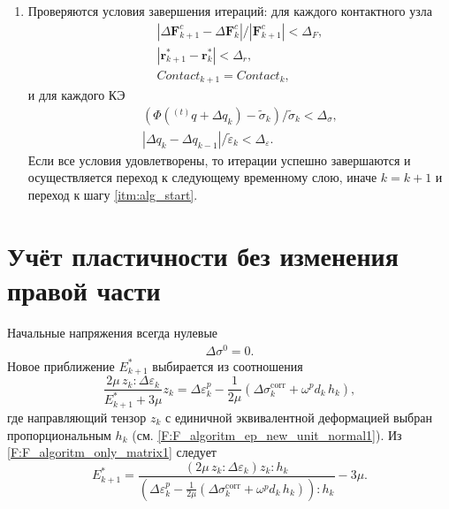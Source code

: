 \begin{enumerate}
	\item
	Проверяются условия завершения итераций: для каждого контактного узла
	\begin{equation}
	\begin{gathered}
	\left|\Delta\mathbf{F}_{k+1}^{c}-\Delta\mathbf{F}_k^{c}\right|/\left|\mathbf{F}_{k+1}^{c}\right|<\Delta_F,\\
	\left|\mathbf{r}_{k+1}^{*}-\mathbf{r}_k^{*}\right|<\Delta_r,\\
	Contact_{k+1}=Contact_{k},
	\label{F:F_algoritm10}
	\end{gathered}
	\end{equation}
	и для каждого КЭ
	\begin{equation}
	\begin{gathered}
	\left(\Phi\left({}^{(t)}q+\Delta q_k\right)-\tilde{\sigma}_k\right)/\tilde{\sigma}_{k}<\Delta_{\sigma},\\
	\left|\Delta q_{k}-\Delta q_{k-1}\right|/\tilde{\varepsilon}_{k}<\Delta_{\varepsilon}.
	\label{F:F_algoritm11}
	\end{gathered}
	\end{equation}
	Если все условия удовлетворены, то итерации успешно завершаются и осуществляется переход к следующему временному слою, иначе $k=k+1$ и переход к шагу \ref{itm:alg_start}.
\end{enumerate}

\section{Учёт пластичности без изменения правой части}
Начальные напряжения всегда нулевые
\begin{equation}
\begin{gathered}
\Delta\sigma^0=0.
\end{gathered}
\end{equation}
Новое приближение $E_{k+1}^*$ выбирается из соотношения
\begin{equation}
\frac{2\mu\,z_{k}:\Delta\varepsilon_k}{E_{k+1}^*+3\mu}z_{k}=\Delta\varepsilon_k^{p}-\frac{1}{2\mu}\left(\Delta\sigma_{k}^{\mathrm{corr}}+\omega^{p}d_k\,h_{k} \right),
\label{F:F_algoritm_only_matrix1}
\end{equation}
где направляющий тензор $z_{k}$ с единичной эквивалентной деформацией выбран пропорциональным $h_k$ (см. \eqref{F:F_algoritm_ep_new_unit_normal1}). Из \eqref{F:F_algoritm_only_matrix1} следует
\begin{equation}
E_{k+1}^*=\frac{\left(2\mu\,z_{k}:\Delta\varepsilon_k\right)z_{k}:h_k}{\left( \Delta\varepsilon_k^{p}-\frac{1}{2\mu}\left(\Delta\sigma_{k}^{\mathrm{corr}}+\omega^{p}d_k\,h_{k} \right)\right):h_{k} }-3\mu.
\label{F:F_algoritm_only_matrix2}
\end{equation}

